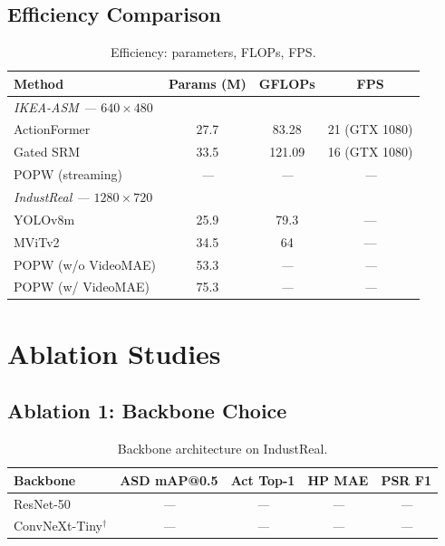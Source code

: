 \documentclass[10pt,journal,compsoc]{IEEEtran}
\newcommand{\popw}{POPW}
\newcommand{\ikea}{IKEA-ASM}
\newcommand{\industreal}{IndustReal}
\newcommand{\todo}{\textit{---}}
\newcommand{\popwres}{\todo}
\begin{document}
\subsection{Efficiency Comparison}

\begin{table}[htbp]
\centering
\small
\caption{Efficiency: parameters, FLOPs, FPS.}
\label{tab:efficiency}
\begin{tabular}{l c c c}
\toprule
\textbf{Method} & \textbf{Params (M)} & \textbf{GFLOPs} & \textbf{FPS} \\
\midrule
\multicolumn{4}{l}{\textit{\ikea{} --- $640\times480$}} \\
ActionFormer & 27.7 & 83.28 & 21 (GTX 1080) \\
Gated SRM & 33.5 & 121.09 & 16 (GTX 1080) \\
\popw{} (streaming) & \popwres & \popwres & \popwres \\
\midrule
\multicolumn{4}{l}{\textit{\industreal{} --- $1280\times720$}} \\
YOLOv8m & 25.9 & 79.3 & --- \\
MViTv2 & 34.5 & 64 & --- \\
\popw{} (w/o VideoMAE) & 53.3 & \popwres & \popwres \\
\popw{} (w/ VideoMAE) & 75.3 & \popwres & \popwres \\
\bottomrule
\end{tabular}
\end{table}

\FloatBarrier

\section{Ablation Studies}
\label{sec:ablation}

\subsection{Ablation 1: Backbone Choice}

\begin{table}[htbp]
\centering
\small
\caption{Backbone architecture on IndustReal.}
\label{tab:abl-backbone}
\begin{tabular}{l c c c c}
\toprule
\textbf{Backbone} & \textbf{ASD mAP@0.5} & \textbf{Act Top-1} & \textbf{HP MAE} & \textbf{PSR F1} \\
\midrule
ResNet-50 & \popwres & \popwres & \popwres & \popwres \\
ConvNeXt-Tiny$^\dagger$ & \popwres & \popwres & \popwres & \popwres \\
\bottomrule
\end{tabular}
\end{table}
\end{document}
